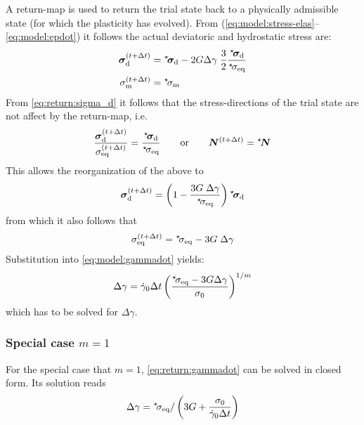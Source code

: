 \documentclass[times,namecite]{goose-article}
\newcommand\leftstar[1]{\hspace*{-.3em}~^\star\!#1}
\begin{document}
A return-map is used to return the trial state back to a physically admissible state (for which the plasticity has evolved). From (\ref{eq:model:stress-elas}--\ref{eq:model:epdot}) it follows the actual deviatoric and hydrostatic stress are:
%
\begin{align}
  \label{eq:return:sigma_d}
  \bm{\sigma}_\mathrm{d}^{(t+\Delta t)}
  &=
  \leftstar{\bm{\sigma}}_\mathrm{d} - 2 G \Delta \gamma \;
  \frac{3}{2}
  \frac{
    \leftstar{\bm{\sigma}}_\mathrm{d}
  }{
    \leftstar{\sigma}_\mathrm{eq}
  }
  \\
  \sigma_\mathrm{m}^{(t+\Delta t)} &= \leftstar{\sigma}_\mathrm{m}
\end{align}
%
From \eqref{eq:return:sigma_d} it follows that the stress-directions of the trial state are not affect by the return-map, i.e.
%
\begin{equation}
  \frac{
    \bm{\sigma}_\mathrm{d}^{(t+\Delta t)}
  }{
    \sigma_\mathrm{eq}^{(t+\Delta t)}
  } =
  \frac{
    \leftstar{\bm{\sigma}}_\mathrm{d}
  }{
    \leftstar{\sigma}_\mathrm{eq}
  }
  \qquad\mathrm{or}\qquad
  \bm{N}^{(t+\Delta t)} = \leftstar{\bm{N}}
\end{equation}
%
This allows the reorganization of the above to
%
\begin{equation}
  \bm{\sigma}_\mathrm{d}^{(t+\Delta t)}
  =
  \left(
    1 -
    \frac{
      3 G \; \Delta \gamma
    }{
      \leftstar{\sigma}_\mathrm{eq}
    }
  \right)
  \leftstar{\bm{\sigma}}_\mathrm{d}
\end{equation}
%
from which it also follows that
%
\begin{equation}
  \sigma_\mathrm{eq}^{(t+\Delta t)}
  =
  \leftstar{\sigma}_\mathrm{eq} - 3 G \; \Delta \gamma
\end{equation}
%
Substitution into \eqref{eq:model:gammadot} yields:
%
\begin{equation}\label{eq:return:gammadot}
  \Delta \gamma
  =
  \dot{\gamma}_0 \Delta t \left(
    \frac{
      \leftstar{\sigma_\mathrm{eq}} - 3 G \Delta \gamma
    }{
      \sigma_0
    }
  \right)^{1/m}
\end{equation}
%
which has to be solved for $\Delta \gamma$.

\subsubsection{Special case $m = 1$}

For the special case that $m = 1$, \eqref{eq:return:gammadot} can be solved in closed form. Its solution reads
%
\begin{equation}
\Delta \gamma =
\leftstar{\sigma}_\mathrm{eq} /
\left(
  3 G + \frac{\sigma_0}{\dot{\gamma}_0 \Delta t}
\right)
\end{equation}
%
\end{document}
